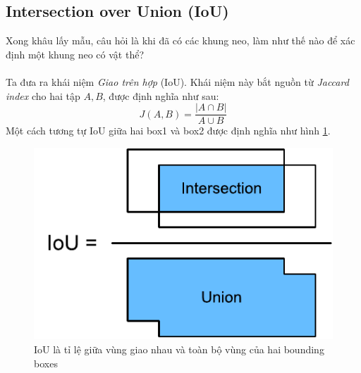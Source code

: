 \documentclass{article}
\begin{document}
\subsection{Intersection over Union (IoU)}
Xong khâu lấy mẫu, câu hỏi là khi đã có các khung neo, làm như thế nào để xác định một khung neo có vật thể?\\\\
Ta đưa ra khái niệm \textit{Giao trên hợp} (IoU). Khái niệm này bắt nguồn từ \textit{Jaccard index} cho hai tập $A, B$, được định nghĩa như sau:
\begin{equation}
    J(A,B) = \frac{|A\cap B|}{A \cup B}
    \label{eq1}
\end{equation}
Một cách tương tự IoU giữa hai box1 và box2 được định nghĩa như hình \ref{fig3}.
\begin{figure}[ht!]
    \centering
    \includegraphics[width = 0.45\linewidth]{iou.pdf}
    \caption{IoU là tỉ lệ giữa vùng giao nhau và toàn bộ vùng của hai bounding boxes}
    \label{fig3}
\end{figure}
\end{document}
